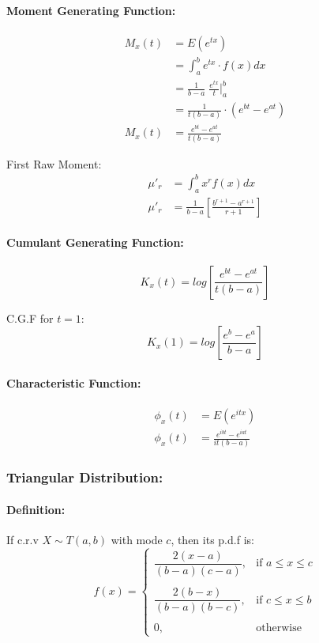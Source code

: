 \documentclass[
10pt, %
a4paper, %
]{report}
\begin{document}
\paragraph*{Moment Generating Function:}

\begin{align*}
    M_x(t) &= E(e^{tx}) \\
           &= \int_a^b e^{tx} \cdot f(x) dx \\
           &= \frac{1}{b-a} \; \frac{e^{tx}}{t} \Biggr|_a^b \\
           &= \frac{1}{t(b-a)}\cdot (e^{bt}-e^{at}) \\
    M_x(t) &= \frac{e^{bt}-e^{at}}{t(b-a)}
\end{align*}

First Raw Moment:
\begin{align*}
    \mu'_r &= \int_a^b x^r f(x) dx \\
    \mu'_r &= \frac{1}{b-a}\left[\frac{b^{r+1}-a^{r+1}}{r+1}\right]
\end{align*}

\paragraph*{Cumulant Generating Function:}

\[
K_x(t)= log\left[\frac{e^{bt}-e^{at}}{t(b-a)}\right]
\]

C.G.F for \(t=1\):
\[
    K_x(1)= log\left[\frac{e^{b}-e^{a}}{b-a}\right]
\]

\paragraph*{Characteristic Function:}
\begin{align*}
    \phi_x(t) &= E(e^{itx}) \\
    \phi _x(t) &= \frac{e^{ibt}-e^{iat}}{it(b-a)}
\end{align*}
    
\subsubsection*{Triangular Distribution:}
\paragraph*{Definition:}
If c.r.v \(X\sim T(a, b)\) with mode \(c\), then its p.d.f is:
\[
    f(x)= 
\begin{cases}
    \dfrac{2(x-a)}{(b-a)(c-a)},        & \text{if } a\leq x \leq c\\ \\
    \dfrac{2(b-x)}{(b-a)(b-c)},        & \text{if } c\leq x \leq b\\ \\
    0,                                & \text{otherwise}
\end{cases}
\]
\end{document}
